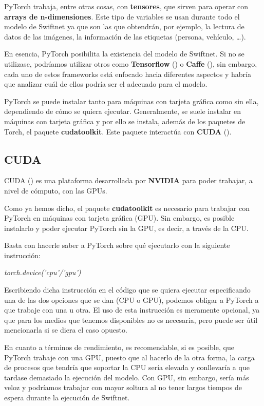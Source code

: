 PyTorch trabaja, entre otras cosas, con \textbf{tensores}, que sirven para operar con \textbf{arrays de n-dimensiones}. Este tipo de variables se usan durante todo el modelo de Swiftnet ya que son las que obtendrán, por ejemplo, la lectura de datos de las imágenes, la información de las etiquetas (persona, vehículo, \ldots).

En esencia, PyTorch posibilita la existencia del modelo de Swiftnet. Si no se utilizase, podríamos utilizar otros como \textbf{Tensorflow} (\cite{tensorflow}) o \textbf{Caffe} (\cite{caffe}), sin embargo, cada uno de estos frameworks está enfocado hacia diferentes aspectos y habría que analizar cuál de ellos podría ser el adecuado para el modelo. 

PyTorch se puede instalar tanto para máquinas con tarjeta gráfica como sin ella, dependiendo de cómo se quiera ejecutar. Generalmente, se suele instalar en máquinas con tarjeta gráfica y por ello se instala, además de los paquetes de Torch, el paquete \textbf{cudatoolkit}. Este paquete interactúa con \textbf{CUDA} (\cite{cuda}).

\subsection{CUDA}

CUDA (\cite{cuda}) es una plataforma desarrollada por \textbf{NVIDIA} para poder trabajar, a nivel de cómputo, con las \ac{GPU}s.

Como ya hemos dicho, el paquete \textbf{cudatoolkit} es necesario para trabajar con PyTorch en máquinas con tarjeta gráfica (\ac{GPU}). Sin embargo, es posible instalarlo y poder ejecutar PyTorch sin la \ac{GPU}, es decir, a través de la \ac{CPU}.

Basta con hacerle saber a PyTorch sobre qué ejecutarlo con la siguiente instrucción:

\begin{center}
\textit{torch.device('cpu'/'gpu')}
\end{center}

Escribiendo dicha instrucción en el código que se quiera ejecutar especificando una de las dos opciones que se dan (\ac{CPU} o \ac{GPU}), podemos obligar a PyTorch a que trabaje con una u otra. El uso de esta instrucción es meramente opcional, ya que para los medios que tenemos disponibles no es necesaria, pero puede ser útil mencionarla si se diera el caso opuesto.

En cuanto a términos de rendimiento, es recomendable, si es posible, que PyTorch trabaje con una \ac{GPU}, puesto que al hacerlo de la otra forma, la carga de procesos que tendría que soportar la \ac{CPU} sería elevada y conllevaría a que tardase demasiado la ejecución del modelo. Con \ac{GPU}, sin embargo, sería más veloz y podríamos trabajar con mayor soltura al no tener largos tiempos de espera durante la ejecución de Swiftnet.


